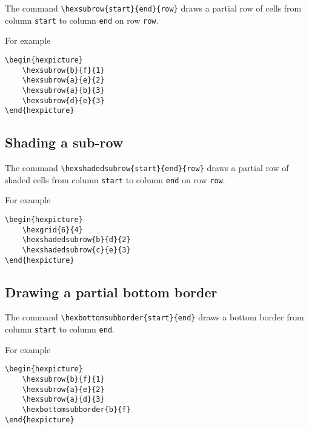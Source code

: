 \documentclass[a4paper,12pt]{article}
\begin{document}
    The command \verb|\hexsubrow{start}{end}{row}| draws a partial row of cells from column \verb|start| to column \verb|end| on row \verb|row|.
    
    For example
    
    \begin{verbatim}\begin{hexpicture}
    \hexsubrow{b}{f}{1}
    \hexsubrow{a}{e}{2}
    \hexsubrow{a}{b}{3}
    \hexsubrow{d}{e}{3}
\end{hexpicture}\end{verbatim}

    \begin{hexpicture}
    \end{hexpicture}

    \subsection{Shading a sub-row}
    
    The command \verb|\hexshadedsubrow{start}{end}{row}| draws a partial row of shaded cells from column \verb|start| to column \verb|end| on row \verb|row|.
    
    For example
    
    \begin{verbatim}\begin{hexpicture}
    \hexgrid{6}{4}
    \hexshadedsubrow{b}{d}{2}
    \hexshadedsubrow{c}{e}{3}
\end{hexpicture}\end{verbatim}
    
    \begin{hexpicture}
    \end{hexpicture}
    
    \subsection{Drawing a partial bottom border}
    
    The command \verb|\hexbottomsubborder{start}{end}| draws a bottom border from column \verb|start| to column \verb|end|.
    
    For example
    
    \begin{verbatim}\begin{hexpicture}
    \hexsubrow{b}{f}{1}
    \hexsubrow{a}{e}{2}
    \hexsubrow{a}{d}{3}
    \hexbottomsubborder{b}{f}
\end{hexpicture}\end{verbatim}
    
\end{document}
